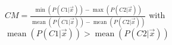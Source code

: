\documentclass{standalone}
\DeclareMathOperator{\mean}{mean}
\begin{document}
$CM = \frac{\min(P(C1|\vec{x}))-\max(P(C2|\vec{x}))}{\mean(P(C1|\vec{x}))-\mean(P(C2|\vec{x}))}$ with $\mean(P(C1|\vec{x}))>\mean(P(C2|\vec{x}))$
\end{document}
